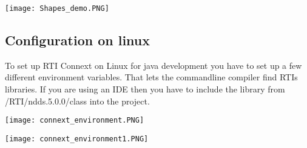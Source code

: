 \begin{center}
	\texttt{[image: Shapes\_demo.PNG]}
\end{center}

\subsection{Configuration on linux}

To set up RTI Connext on Linux for java development you have to set up a few different environment variables. That lets the commandline compiler find RTIs libraries. If you are using an IDE then you have to include the library from /RTI/ndds.5.0.0/class into the project.

\begin{center}
	\texttt{[image: connext\_environment.PNG]}
\end{center}

\begin{center}
	\texttt{[image: connext\_environment1.PNG]}
\end{center}